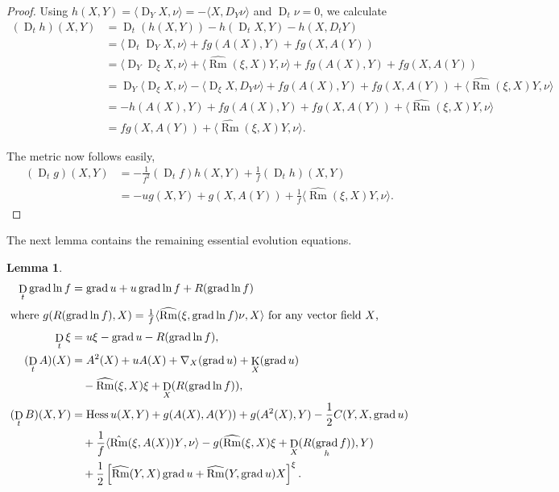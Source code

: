 \documentclass{amsart}
\newtheorem{lemma}[theorem]{Lemma}
\theoremstyle{definition}
\theoremstyle{remark}
\newcommand{\ip}[2]{\ensuremath{\langle{#1},{#2}\rangle}}
\DeclareMathOperator{\grad}{grad}
\DeclareMathOperator{\Rm}{Rm}
\DeclareMathOperator{\hess}{Hess}
\DeclareMathOperator{\diff}{K}
\DeclareMathOperator{\D}{D}
\numberwithin{equation}{section}
\begin{document}
\begin{proof}
Using $h(X,Y) = \ip{\D_Y X}{\nu} = -\ip{X}{D_Y \nu}$ and $\D_t\nu = 0$, we calculate
\[
\begin{split}
(\D_t h) (X, Y) &= \D_t (h(X, Y)) - h(\D_t X, Y) - h(X, D_t Y) \\
&= \ip{\D_t \D_Y X}{\nu} + f g(A(X), Y) + f g(X, A(Y)) \\
&= \ip{\D_Y \D_{\xi} X}{\nu} + \ip{\widehat{\Rm}(\xi, X) Y}{\nu} + f g(A(X), Y) + f g(X, A(Y))\\
&= \D_Y \ip{\D_{\xi} X}{\nu} - \ip{\D_{\xi} X}{D_Y \nu} + f g(A(X), Y) + f g(X, A(Y)) + \ip{\widehat{\Rm}(\xi, X) Y}{\nu} \\
&= - h(A(X), Y) + f g(A(X), Y) + f g(X, A(Y)) + \ip{\widehat{\Rm}(\xi, X) Y}{\nu} \\
&= fg(X, A(Y)) + \ip{\widehat{\Rm}(\xi, X) Y}{\nu}.
\end{split}
\]

The metric now follows easily,
\[
\begin{split}
(\D_t g) (X, Y) &= -\frac{1}{f^2} (\D_t f) h(X, Y) + \frac{1}{f} (\D_t h) (X, Y) \\
&= -u g(X, Y) + g(X, A(Y)) + \frac{1}{f} \ip{\widehat{\Rm}(\xi, X) Y}{\nu}.
\end{split}
\]
\end{proof}

The next lemma contains the remaining essential evolution equations.

\begin{lemma}
\label{lem:evolutions}
\begin{align*}
\D_t \grad \ln f &= \grad u + u \grad \ln f + R(\grad \ln f) \\
\intertext{where $g(R({\grad \ln f}), X) = \frac{1}{f} \ip{\widehat{\Rm}(\xi, \grad \ln f) \nu}{X}$ for any vector field $X$,}
\D_t \xi &= u\xi - \grad u - R(\grad \ln f), \\
(\D_t A)(X) &= A^2(X) + u A(X) + \nabla_X (\grad u) + \diff_X (\grad u) \\
&\quad - \widehat{\Rm} (\xi, X) \xi + \D_X (R(\grad \ln f)), \\
(\D_t B) (X, Y) &= \hess u (X, Y) + g(A(X), A(Y)) + g(A^2(X), Y) - \frac{1}{2} C(Y, X, \grad u) \\
&\quad +\frac{1}{f} \ip{\hat{\Rm} (\xi, A(X))Y}{\nu} - g(\widehat{\Rm}(\xi, X)\xi  + \D_X (R(\grad_h f)), Y) \\
&\quad + \frac{1}{2} \left[\widehat{\Rm} (Y, X)\grad u +  \widehat{\Rm} (Y, \grad u) X\right]^{\xi}.
\end{align*}
\end{lemma}
\end{document}
